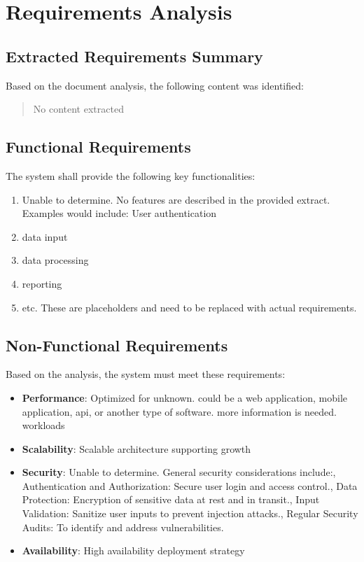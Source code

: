 \documentclass[11pt,a4paper,oneside]{article}
\begin{document}
\section{Requirements Analysis}

\subsection{Extracted Requirements Summary}

Based on the document analysis, the following content was identified:

\begin{quote}
No content extracted
\end{quote}

\subsection{Functional Requirements}

The system shall provide the following key functionalities:
\begin{enumerate}
\item Unable to determine. No features are described in the provided extract. Examples would include: User authentication
\item data input
\item data processing
\item reporting
\item etc. These are placeholders and need to be replaced with actual requirements.
\end{enumerate}

\subsection{Non-Functional Requirements}

Based on the analysis, the system must meet these requirements:
\begin{itemize}
\item \textbf{Performance}: Optimized for unknown.  could be a web application, mobile application, api, or another type of software.  more information is needed. workloads
\item \textbf{Scalability}: Scalable architecture supporting growth
\item \textbf{Security}: Unable to determine. General security considerations include:, Authentication and Authorization: Secure user login and access control., Data Protection: Encryption of sensitive data at rest and in transit., Input Validation: Sanitize user inputs to prevent injection attacks., Regular Security Audits: To identify and address vulnerabilities.
\item \textbf{Availability}: High availability deployment strategy
\end{itemize}
\end{document}

